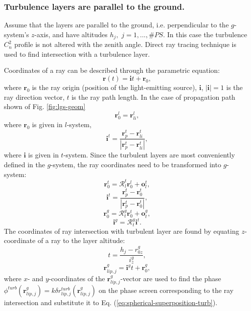 \subsubsection{Turbulence layers are parallel to the ground.}

Assume that the layers are parallel to the ground, i.e. perpendicular to the
$g$-system's $z$-axis, and have altitudes $h_{j}, \,\, j = 1,...,\#PS$. In
this case the turbulence $C_{n}^{2}$ profile is not altered with the zenith
angle. Direct ray tracing technique is used to find intersection with a
turbulence layer.

Coordinates of a ray can be described through the parametric equation:
\begin{equation} \label{eq:ray-equation}
	\bm{r}(t) = \bm{i} t + \bm{r}_{0},
\end{equation}
where $\bm{r}_{0}$ is the ray origin (position of the light-emitting source),
$\bm{i}$, $|\bm{i}| = 1$ is the ray
direction vector, $t$ is the ray path length. In the case of propagation path
shown of Fig. \ref{fig:lgs-geom}
$$ \bm{r}^{l}_{0} = \bm{r}^{l}_{li}, $$
where $\bm{r}_{0}$ is given in $l$-system,
$$ \bm{i}^{t} = \frac{\bm{r}^{t}_{p} - \bm{r}^{t}_{li}}
                 {|\bm{r}^{t}_{p} - \bm{r}^{t}_{li}|}, $$
where $\bm{i}$ is given in $t$-system. Since the turbulent layers are most
conveniently defined in the $g$-system, the ray coordinates need to be
transformed into $g$-system:
\begin{equation} \label{eq:ray-transform}
	\bm{r}^{t}_{0} = \mathcal{R}_{l}^{t} \bm{r}^{l}_{0} + \bm{o}_{l}^{t},
\end{equation}
$$ \bm{i}^{t} = \frac{\bm{r}^{t}_{p} - \bm{r}^{t}_{0}}
                 {|\bm{r}^{t}_{p} - \bm{r}^{t}_{0}|}, $$
$$ \bm{r}^{g}_{0} = \mathcal{R}_{t}^{g} \bm{r}^{t}_{0} + \bm{o}_{t}^{g}, $$
$$ \bm{i}^{g} = \mathcal{R}_{t}^{g} \bm{i}^{t}. $$
The coordinates of ray intersection with turbulent layer are found by equating
$z$-coordinate of a ray to the layer altitude:
\begin{equation} \label{eq:layer-intersection}
	t = \frac{h_{j}-r^{g}_{0z}}{i^{g}_{z}},
\end{equation}
$$ \bm{r}^{g}_{lip,j} = \bm{i}^{g} t + \bm{r}_{0}^{g}, $$
where $x$- and $y$-coordinates of the $\bm{r}^{g}_{lip,j}$-vector are used to
find the phase $\phi^{turb}(\bm{r}^{g}_{lip,j}) = k \delta r^{turb}_{lip,j}
(\bm{r}^{g}_{lip,j})$ on the phase
screen corresponding to the ray intersection and substitute it to Eq.
(\ref{eq:spherical-superposition-turb}).


